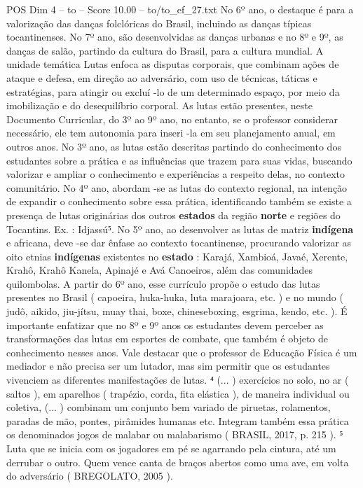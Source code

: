 \begin{textsample}{POS Dim 4 – to – Score 10.00 – to/to\_ef\_27.txt}
No 6º ano, o destaque é para a valorização das danças folclóricas do Brasil, incluindo as danças típicas tocantinenses.
No 7º ano, são desenvolvidas as danças urbanas e no 8º e 9º, as danças de salão, partindo da cultura do Brasil, para a cultura mundial.
A unidade temática Lutas enfoca as disputas corporais, que combinam ações de ataque e defesa, em direção ao adversário, com uso de técnicas, táticas e estratégias, para atingir ou excluí -lo de um determinado espaço, por meio da imobilização e do desequilíbrio corporal.
As lutas estão presentes, neste Documento Curricular, do 3º ao 9º ano, no entanto, se o professor considerar necessário, ele tem autonomia para inseri -la em seu planejamento anual, em outros anos.
No 3º ano, as lutas estão descritas partindo do conhecimento dos estudantes sobre a prática e as influências que trazem para suas vidas, buscando valorizar e ampliar o conhecimento e experiências a respeito delas, no contexto comunitário.
No 4º ano, abordam -se as lutas do contexto regional, na intenção de expandir o conhecimento sobre essa prática, identificando também se existe a presença de lutas originárias dos outros \textbf{estados} da região \textbf{norte} e regiões do Tocantins.
Ex. : Idjassú⁵.
No 5º ano, ao desenvolver as lutas de matriz \textbf{indígena} e africana, deve -se dar ênfase ao contexto tocantinense, procurando valorizar as oito etnias \textbf{indígenas} existentes no \textbf{estado} : Karajá, Xambioá, Javaé, Xerente, Krahô, Krahô Kanela, Apinajé e Avá Canoeiros, além das comunidades quilombolas.
A partir do 6º ano, esse currículo propõe o estudo das lutas presentes no Brasil ( capoeira, huka-huka, luta marajoara, etc. ) e no mundo ( judô, aikido, jiu-jítsu, muay thai, boxe, chineseboxing, esgrima, kendo, etc. ).
É importante enfatizar que no 8º e 9º anos os estudantes devem perceber as transformações das lutas em esportes de combate, que também é objeto de conhecimento nesses anos.
Vale destacar que o professor de Educação Física é um mediador e não precisa ser um lutador, mas sim permitir que os estudantes vivenciem as diferentes manifestações de lutas. ⁴ (... ) exercícios no solo, no ar ( saltos ), em aparelhos ( trapézio, corda, fita elástica ), de maneira individual ou coletiva, (... ) combinam um conjunto bem variado de piruetas, rolamentos, paradas de mão, pontes, pirâmides humanas etc.
Integram também essa prática os denominados jogos de malabar ou malabarismo ( BRASIL, 2017, p. 215 ). ⁵ Luta que se inicia com os jogadores em pé se agarrando pela cintura, até um derrubar o outro.
Quem vence canta de braços abertos como uma ave, em volta do adversário ( BREGOLATO, 2005 ).

\end{textsample}

